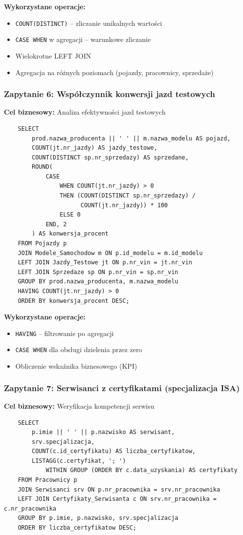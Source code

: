 \documentclass[a4paper,titleauthor]{mwart}
\begin{document}
	\textbf{Wykorzystane operacje:}
	\begin{itemize}
		\item \texttt{COUNT(DISTINCT)} -- zliczanie unikalnych wartości
		\item \texttt{CASE WHEN} w agregacji -- warunkowe zliczanie
		\item Wielokrotne LEFT JOIN
		\item Agregacja na różnych poziomach (pojazdy, pracownicy, sprzedaże)
	\end{itemize}

	\subsubsection{Zapytanie 6: Współczynnik konwersji jazd testowych}

	\textbf{Cel biznesowy:} Analiza efektywności jazd testowych

	\begin{verbatim}
	SELECT 
		prod.nazwa_producenta || ' ' || m.nazwa_modelu AS pojazd,
		COUNT(jt.nr_jazdy) AS jazdy_testowe,
		COUNT(DISTINCT sp.nr_sprzedazy) AS sprzedane,
		ROUND(
			CASE 
				WHEN COUNT(jt.nr_jazdy) > 0 
				THEN (COUNT(DISTINCT sp.nr_sprzedazy) / 
					  COUNT(jt.nr_jazdy)) * 100 
				ELSE 0 
			END, 2
		) AS konwersja_procent
	FROM Pojazdy p
	JOIN Modele_Samochodow m ON p.id_modelu = m.id_modelu
	LEFT JOIN Jazdy_Testowe jt ON p.nr_vin = jt.nr_vin
	LEFT JOIN Sprzedaze sp ON p.nr_vin = sp.nr_vin
	GROUP BY prod.nazwa_producenta, m.nazwa_modelu
	HAVING COUNT(jt.nr_jazdy) > 0
	ORDER BY konwersja_procent DESC;
	\end{verbatim}

	\textbf{Wykorzystane operacje:}
	\begin{itemize}
		\item \texttt{HAVING} -- filtrowanie po agregacji
		\item \texttt{CASE WHEN} dla obsługi dzielenia przez zero
		\item Obliczenie wskaźnika biznesowego (KPI)
	\end{itemize}

	\subsubsection{Zapytanie 7: Serwisanci z certyfikatami (specjalizacja ISA)}

	\textbf{Cel biznesowy:} Weryfikacja kompetencji serwisu

	\begin{verbatim}
	SELECT 
		p.imie || ' ' || p.nazwisko AS serwisant,
		srv.specjalizacja,
		COUNT(c.id_certyfikatu) AS liczba_certyfikatow,
		LISTAGG(c.certyfikat, '; ') 
			WITHIN GROUP (ORDER BY c.data_uzyskania) AS certyfikaty
	FROM Pracownicy p
	JOIN Serwisanci srv ON p.nr_pracownika = srv.nr_pracownika
	LEFT JOIN Certyfikaty_Serwisanta c ON srv.nr_pracownika = c.nr_pracownika
	GROUP BY p.imie, p.nazwisko, srv.specjalizacja
	ORDER BY liczba_certyfikatow DESC;
	\end{verbatim}
\end{document}
